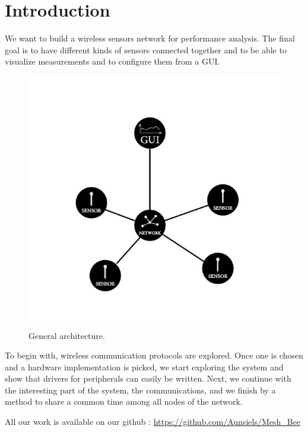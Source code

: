 \section{Introduction}
\label{s:Introduction}

We want to build a wireless sensors network for performance analysis. The final goal is to have different kinds of sensors connected together and to be able to visualize measurements and to configure them from a GUI.

\begin{figure}[ht]
\centering
\includegraphics[width=.6\linewidth]{global_archi}
\caption[General Architecture]{\label{f:global_archi}General architecture.}
\end{figure}

To begin with, wireless communication protocols are explored. Once one is chosen and a hardware implementation is picked, we start exploring the system and show that drivers for peripherals can easily be written. Next, we continue with the interesting part of the system, the communications, and we finish by a method to share a common time among all nodes of the network.

All our work is available on our github : \url{https://github.com/Aunsiels/Mesh_Bee}